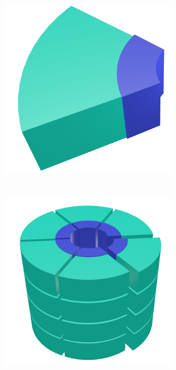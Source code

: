 \documentclass[journal=jpcbfk,manuscript=article]{achemso}
\begin{document}
\begin{figure}
\begin{subfigure}{0.3\linewidth}
		\includegraphics[width=\textwidth]{wedge_thick.png}
		\caption{}~\label{fig:wedge}
	\end{subfigure}
		\begin{subfigure}{0.4\linewidth}
		\centering
		\includegraphics[width=\textwidth]{columns.png}

\end{subfigure}
\end{figure}
\end{document}
